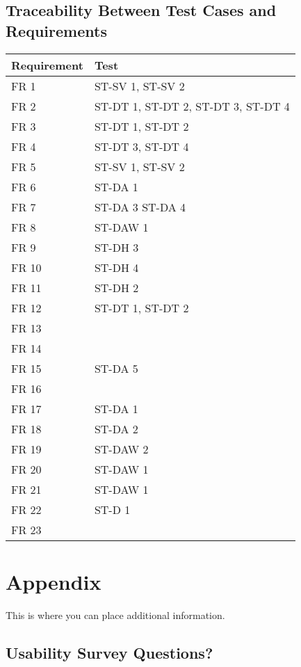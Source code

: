 \documentclass[12pt, titlepage]{article}
\begin{document}
\subsection{Traceability Between Test Cases and Requirements}
\begin{tabular}{| p{} | p{}|}
  \hline
  \rowcolor[gray]{0.9}
  Requirement & Test \\
  \hline
  FR 1 & ST-SV 1, ST-SV 2 \\
  \hline
  FR 2 & ST-DT 1, ST-DT 2, ST-DT 3, ST-DT 4 \\
  \hline
  FR 3 & ST-DT 1, ST-DT 2 \\
  \hline
  FR 4 & ST-DT 3, ST-DT 4 \\
  \hline
  FR 5 & ST-SV 1, ST-SV 2 \\
  \hline
  FR 6 & ST-DA 1 \\
  \hline
  FR 7 & ST-DA 3 ST-DA 4 \\
  \hline
  FR 8 & ST-DAW 1 \\
  \hline
  FR 9 & ST-DH 3 \\
  \hline
  FR 10 & ST-DH 4 \\
  \hline
  FR 11 & ST-DH 2 \\
  \hline
  FR 12 & ST-DT 1, ST-DT 2 \\
  \hline
  FR 13 &  \\
  \hline
  FR 14 &  \\
  \hline
  FR 15 & ST-DA 5\\
  \hline
  FR 16 &  \\
  \hline
  FR 17 & ST-DA 1 \\
  \hline
  FR 18 & ST-DA 2 \\
  \hline
  FR 19 & ST-DAW 2 \\
  \hline
  FR 20 & ST-DAW 1 \\
  \hline
  FR 21 & ST-DAW 1 \\
  \hline
  FR 22 & ST-D 1 \\
  \hline
  FR 23 &  \\
  \hline
  
\end{tabular}


  \newpage




				




\newpage

\section{Appendix}

This is where you can place additional information.

\subsection{Usability Survey Questions?}

\end{document}
